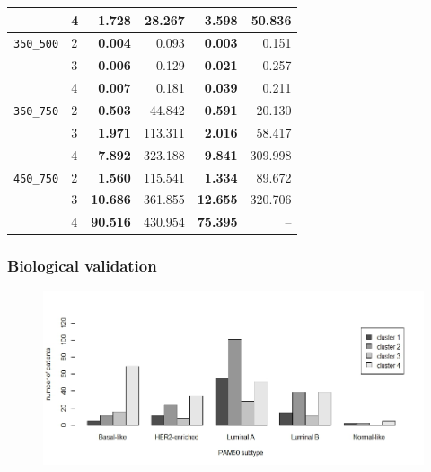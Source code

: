 \documentclass[conference]{IEEEtran}
\begin{document}
\begin{table}
\begin{tabular}{|ll|rr|rr|}
         & 4 &       \textbf{1.728} &    28.267 &       \textbf{3.598} &    50.836 \\
\hline         
\texttt{350\_500} & 2 &       \textbf{0.004} &     0.093 &       \textbf{0.003} &     0.151 \\
         & 3 &       \textbf{0.006} &     0.129 &       \textbf{0.021} &     0.257 \\
         & 4 &       \textbf{0.007} &     0.181 &       \textbf{0.039} &     0.211 \\
\hline         
\texttt{350\_750} & 2 &       \textbf{0.503} &    44.842 &       \textbf{0.591} &    20.130 \\
         & 3 &       \textbf{1.971} &   113.311 &       \textbf{2.016} &    58.417 \\
         & 4 &       \textbf{7.892} &   323.188 &       \textbf{9.841} &   309.998 \\
\hline         
\texttt{450\_750} & 2 &       \textbf{1.560} &   115.541 &       \textbf{1.334} &    89.672 \\
         & 3 &      \textbf{10.686} &   361.855 &      \textbf{12.655} &   320.706 \\
         & 4 &      \textbf{90.516} &   430.954 &      \textbf{75.395} &       -- \\
\hline
\end{tabular}
\end{table}

\subsubsection{Biological validation}

\begin{figure}
\centering
\includegraphics[scale=0.33]{images/Plot_clusters_per_subtype_4Groups.jpeg}
\captionsetup{font=small}
\label{fig:plot_clusters_subtype}
\end{figure}
\end{document}
